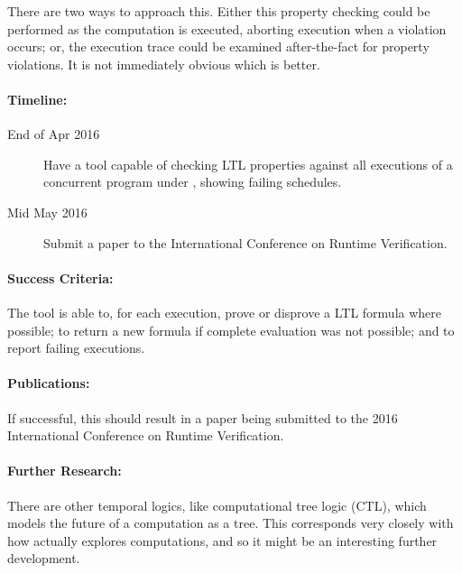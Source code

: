 There are two ways to approach this. Either this property checking
could be performed as the computation is executed, aborting execution
when a violation occurs; or, the execution trace could be examined
after-the-fact for property violations. It is not immediately obvious
which is better.

\paragraph{Timeline:}

\begin{description}
\item[End of Apr 2016] Have a tool capable of checking LTL properties
  against all executions of a concurrent program under \dejafu{},
  showing failing schedules.
\item[Mid May 2016] Submit a paper to the International Conference on
  Runtime Verification.
\end{description}

\paragraph{Success Criteria:}

The tool is able to, for each execution, prove or disprove a LTL
formula where possible; to return a new formula if complete evaluation
was not possible; and to report failing executions.

\paragraph{Publications:}

If successful, this should result in a paper being submitted to the
2016 International Conference on Runtime Verification.

\paragraph{Further Research:}

There are other temporal logics, like computational tree logic (CTL),
which models the future of a computation as a tree. This corresponds
very closely with how \dejafu{} actually explores computations, and so
it might be an interesting further development.
